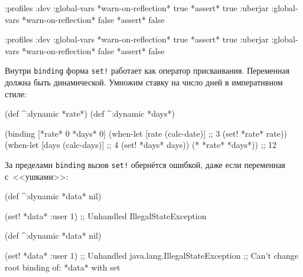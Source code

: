 \ifnarrow

\begin{english}
  \begin{clojure}
{:profiles
 :dev {:global-vars
       {*warn-on-reflection* true
        *assert* true}}
 :uberjar {:global-vars
           {*warn-on-reflection* false
            *assert* false}}}
  \end{clojure}
\end{english}

\else

\begin{english}
  \begin{clojure}
{:profiles
 :dev {:global-vars {*warn-on-reflection* true
                     *assert* true}}
 :uberjar {:global-vars {*warn-on-reflection* false
                         *assert* false}}}
  \end{clojure}
\end{english}

\fi

Внутри \verb|binding| форма \verb|set!| работает как оператор
присваивания. Переменная должна быть динамической. Умножим ставку на число дней
в императивном стиле:

\begin{english}
  \begin{clojure}
(def ^:dynamic *rate*)
(def ^:dynamic *days*)

(binding [*rate* 0
          *days* 0]
  (when-let [rate (calc-date)] ;; 3
    (set! *rate* rate))
  (when-let [days (calc-days)] ;; 4
    (set! *days* days))
  (* *rate* *days*))
;; 12
  \end{clojure}
\end{english}

За пределами \verb|binding| вызов \verb|set!| обернётся ошибкой, даже если
переменная с~<<ушками>>:

\ifnarrow

\begin{english}
  \begin{clojure}
(def ^:dynamic *data* nil)

(set! *data* {:user 1})
;; Unhandled IllegalStateException
  \end{clojure}
\end{english}

\else

\begin{english}
  \begin{clojure}
(def ^:dynamic *data* nil)

(set! *data* {:user 1})
;; Unhandled java.lang.IllegalStateException
;; Can't change root binding of: *data* with set
  \end{clojure}
\end{english}

